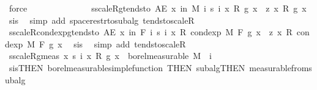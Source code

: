 \begin{isabellebody}
\ force\isanewline
\isanewline
\ \ \ \ \ \ \isanewline
\isanewline
\ \ \ \ \ \ \isamarkupfalse%
\ s{\isacharunderscore}{\kern0pt}scaleR{\isacharunderscore}{\kern0pt}g{\isacharunderscore}{\kern0pt}tendsto{\isacharcolon}{\kern0pt}\ {\isachardoublequoteopen}AE\ x\ in\ M{\isachardot}{\kern0pt}\ {\isacharparenleft}{\kern0pt}{\isasymlambda}i{\isachardot}{\kern0pt}\ s\ i\ x\ {\isacharasterisk}{\kern0pt}\isactrlsub R\ g\ x{\isacharparenright}{\kern0pt}\ {\isasymlonglonglongrightarrow}\ z\ x\ {\isacharasterisk}{\kern0pt}\isactrlsub R\ g\ x{\isachardoublequoteclose}\ \isamarkupfalse%
\ s{\isacharunderscore}{\kern0pt}is{\isacharparenleft}{\kern0pt}{}{\isacharparenright}{\kern0pt}\ \isamarkupfalse%
\ {\isacharparenleft}{\kern0pt}simp\ add{\isacharcolon}{\kern0pt}\ space{\isacharunderscore}{\kern0pt}restr{\isacharunderscore}{\kern0pt}to{\isacharunderscore}{\kern0pt}subalg\ tendsto{\isacharunderscore}{\kern0pt}scaleR{\isacharparenright}{\kern0pt}\isanewline
\ \ \ \ \ \ \isamarkupfalse%
\ s{\isacharunderscore}{\kern0pt}scaleR{\isacharunderscore}{\kern0pt}cond{\isacharunderscore}{\kern0pt}exp{\isacharunderscore}{\kern0pt}g{\isacharunderscore}{\kern0pt}tendsto{\isacharcolon}{\kern0pt}\ {\isachardoublequoteopen}AE\ x\ in\ {\isacharquery}{\kern0pt}F{\isachardot}{\kern0pt}\ {\isacharparenleft}{\kern0pt}{\isasymlambda}i{\isachardot}{\kern0pt}\ s\ i\ x\ {\isacharasterisk}{\kern0pt}\isactrlsub R\ cond{\isacharunderscore}{\kern0pt}exp\ M\ F\ g\ x{\isacharparenright}{\kern0pt}\ {\isasymlonglonglongrightarrow}\ z\ x\ {\isacharasterisk}{\kern0pt}\isactrlsub R\ cond{\isacharunderscore}{\kern0pt}exp\ M\ F\ g\ x{\isachardoublequoteclose}\ \isamarkupfalse%
\ s{\isacharunderscore}{\kern0pt}is{\isacharparenleft}{\kern0pt}{}{\isacharparenright}{\kern0pt}\ \isamarkupfalse%
\ {\isacharparenleft}{\kern0pt}simp\ add{\isacharcolon}{\kern0pt}\ tendsto{\isacharunderscore}{\kern0pt}scaleR{\isacharparenright}{\kern0pt}\isanewline
\isanewline
\ \ \ \ \ \ \isamarkupfalse%
\ s{\isacharunderscore}{\kern0pt}scaleR{\isacharunderscore}{\kern0pt}g{\isacharunderscore}{\kern0pt}meas{\isacharcolon}{\kern0pt}\ {\isachardoublequoteopen}{\isacharparenleft}{\kern0pt}{\isasymlambda}x{\isachardot}{\kern0pt}\ s\ i\ x\ {\isacharasterisk}{\kern0pt}\isactrlsub R\ g\ x{\isacharparenright}{\kern0pt}\ {\isasymin}\ borel{\isacharunderscore}{\kern0pt}measurable\ M{\isachardoublequoteclose}\ \ i\ \isamarkupfalse%
\ s{\isacharunderscore}{\kern0pt}is{\isacharparenleft}{\kern0pt}{}{\isacharparenright}{\kern0pt}{\isacharbrackleft}{\kern0pt}THEN\ borel{\isacharunderscore}{\kern0pt}measurable{\isacharunderscore}{\kern0pt}simple{\isacharunderscore}{\kern0pt}function{\isacharcomma}{\kern0pt}\ THEN\ subalg{\isacharprime}{\kern0pt}{\isacharbrackleft}{\kern0pt}THEN\ measurable{\isacharunderscore}{\kern0pt}from{\isacharunderscore}{\kern0pt}subalg{\isacharbrackright}{\kern0pt}{\isacharbrackright}{\kern0pt}\ \isamarkupfalse%

\end{isabellebody}
